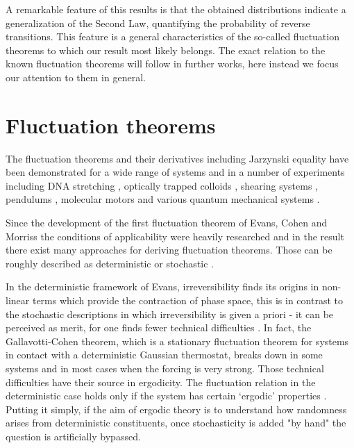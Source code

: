 \documentclass[a4paper,12pt]{article}
\begin{document}
A remarkable feature of this results is that the obtained distributions indicate a generalization of the Second Law, quantifying the probability of reverse transitions. This feature is a general characteristics of the so-called fluctuation theorems to which our result most likely belongs.
The exact relation to the known fluctuation theorems will follow in further works, here instead we focus our attention to them in general.

\section{Fluctuation theorems}
\label{FluctuationTheorems}

The fluctuation theorems and their derivatives including Jarzynski equality have been demonstrated for a wide range of systems and in a number of experiments including DNA stretching \cite{Collin:2005fx}, optically trapped colloids \cite{Carberry:2007be}, shearing systems \cite{Evans:1993bl}, pendulums \cite{Ciliberto:2010jg}, molecular motors \cite{Seifert:2005it} and various quantum mechanical systems \cite{Monnai:2005ke}.

Since the development of the first fluctuation theorem of Evans, Cohen and Morriss the conditions of applicability were heavily researched and in the result there exist many approaches for deriving fluctuation theorems. 
Those can be roughly described as deterministic \cite{Evans:2002gg, Evans:2241458} or stochastic \cite{Kurchan:1998, Searles:1999fz}.

In the deterministic framework of Evans, irreversibility finds its origins in non-linear terms which provide the contraction of phase space, this is in contrast to the stochastic descriptions in which irreversibility is given a priori - it can be perceived as merit, for one finds fewer technical difficulties \cite{Crooks:2008ta}. 
In fact, the Gallavotti-Cohen theorem, which is a stationary fluctuation theorem for systems in contact with a deterministic Gaussian thermostat, breaks down in some systems and in most cases when the forcing is very strong.  
Those technical difficulties have their source in ergodicity. The fluctuation relation in the deterministic case holds only if the system has certain ‘ergodic’ properties \cite{Kurchan:2009ub}. Putting it simply, if the aim of ergodic theory is to understand how randomness arises from deterministic constituents, once stochasticity is added "by hand" the question is artificially bypassed. 
\end{document}
